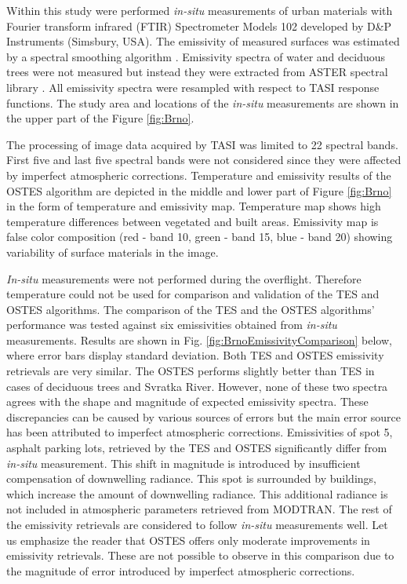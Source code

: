 Within this study were performed \textit{in-situ} measurements of urban materials with Fourier transform infrared (FTIR) Spectrometer Models 102 developed by D\&P Instruments (Simsbury, USA). The emissivity of measured surfaces was estimated by a spectral smoothing algorithm \cite{HJ98}. Emissivity spectra of water and deciduous trees were not measured but instead they were extracted from ASTER spectral library \cite{BH09}. All emissivity spectra were resampled with respect to TASI response functions. The study area and locations of the \textit{in-situ} measurements are shown in the upper part of the Figure \ref{fig:Brno}. 

The processing of image data acquired by TASI was limited to 22 spectral bands. First five and last five spectral bands were not considered since they were affected by imperfect atmospheric corrections. Temperature and emissivity results of the OSTES algorithm are depicted in the middle and lower part of Figure \ref{fig:Brno} in the form of temperature and emissivity map. Temperature map shows high temperature differences between vegetated and built areas. Emissivity map is false color composition (red - band 10, green - band 15, blue - band 20) showing variability of surface materials in the image.

\textit{In-situ} measurements were not performed during the overflight. Therefore temperature could not be used for comparison and validation of the TES and OSTES algorithms. The comparison of the TES and the OSTES algorithms' performance was tested against six emissivities obtained from \textit{in-situ} measurements. Results are shown in Fig. \ref{fig:BrnoEmissivityComparison} below, where error bars display standard deviation. Both TES and OSTES emissivity retrievals are very similar. The OSTES performs slightly better than TES in cases of deciduous trees and Svratka River. However, none of these two spectra agrees with the shape and magnitude of expected emissivity spectra. These discrepancies can be caused by various sources of errors but the main error source has been attributed to imperfect atmospheric corrections. Emissivities of spot 5, asphalt parking lots, retrieved by the TES and OSTES significantly differ from \textit{in-situ} measurement. This shift in magnitude is introduced by insufficient compensation of downwelling radiance. This spot is surrounded by buildings, which increase the amount of downwelling radiance. This additional radiance is not included in atmospheric parameters retrieved from MODTRAN. The rest of the emissivity retrievals are considered to follow \textit{in-situ} measurements well. Let us emphasize the reader that OSTES offers only moderate improvements in emissivity retrievals. These are not possible to observe in this comparison due to the magnitude of error introduced by imperfect atmospheric corrections. 

